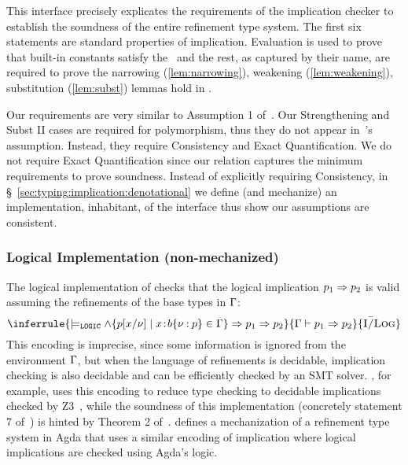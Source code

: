 \noindent
This interface  precisely explicates
the requirements of
the implication checker 
to establish the soundness of the
entire refinement type system.
%
The first six statements are standard properties of implication. 
Evaluation is used to prove that built-in constants satisfy the~ 
and the rest, as captured by their name, are required to prove  
the narrowing (\ref{lem:narrowing}), weakening (\ref{lem:weakening}), 
substitution (\ref{lem:subst}) lemmas hold in \sysrf. 

Our requirements are very similar to Assumption 1 of~\cite{Knowles09}. 
Our Strengthening and Subst II cases are required for polymorphism, thus 
they do not appear in~\citet{Knowles09}'s assumption.  
Instead, they require Consistency and Exact Quantification. 
We do not require Exact Quantification since our relation captures 
the minimum requirements to prove soundness. 
Instead of explicitly requiring Consistency, 
in \S~\ref{sec:typing:implication:denotational} we define (and mechanize) an implementation, \ie inhabitant, 
of the interface thus show our assumptions are consistent. 


\subsubsection{Logical Implementation (non-mechanized)}
\label{sec:typing:implication:logical}
The logical implementation of 
checks that the logical implication $p_1 \Rightarrow p_2$
is valid assuming the refinements of the base types in $\mathrm{\Gamma}$:
%
$$
  \inferrule
  {\models_{\texttt{LOGIC}} \wedge\{ \subst{\spred}{\vv}{x} \mid \bind{x}{\breft{\sbase}{\vv}{\spred}} \in \tcenv \} \Rightarrow \spred_1 \Rightarrow \spred_2 }
  {\imply{\tcenv}{\spred_1}{\spred_2}}
  {\iLog}
$$
This encoding is imprecise, since some information is ignored from the environment $\mathrm{\Gamma}$, 
but when the language of refinements is decidable, implication checking 
is also decidable and can be efficiently checked by an SMT solver.
\lh, for example, uses this encoding to reduce type checking to decidable 
implications checked by Z3~\cite{z3}, while the soundness 
of this implementation (concretely statement 7 of~) 
is hinted by Theorem 2 of~\cite{Vazou14}.
\citet{10.1145/3546196.3550162} defines a mechanization of a 
refinement type system in Agda that uses a similar encoding of implication
where logical implications are checked using Agda's logic. 



